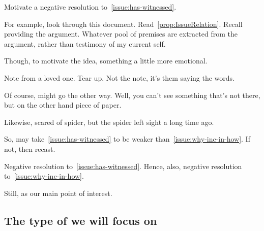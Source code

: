 \begin{note}
  \begin{goal}
    Motivate a negative resolution to~\autoref{issue:has-witnessed}.
  \end{goal}
\end{note}

\begin{note}
  For example, look through this document.
  Read~\autoref{prop:IssueRelation}.
  Recall providing the argument.
  Whatever pool of premises are extracted from the argument, rather than testimony of my current self.

  Though, to motivate the idea, something a little more emotional.

  Note from a loved one.
  Tear up.
  Not the note, it's them saying the words.

  Of course, might go the other way.
  Well, you can't see something that's not there, but on the other hand piece of paper.

  Likewise, scared of spider, but the spider left sight a long time ago.
\end{note}

\begin{note}
  So, may take~\autoref{issue:has-witnessed} to be weaker than~\autoref{issue:why-inc-in-how}.
  If not, then recast.

  Negative resolution to~\autoref{issue:has-witnessed}.
  Hence, also, negative resolution to~\autoref{issue:why-inc-in-how}.

  Still, \iWitness{} as our main point of interest.
\end{note}


\subsection{The type of  we will focus on}
\label{overview:sec:type-of-scen}

